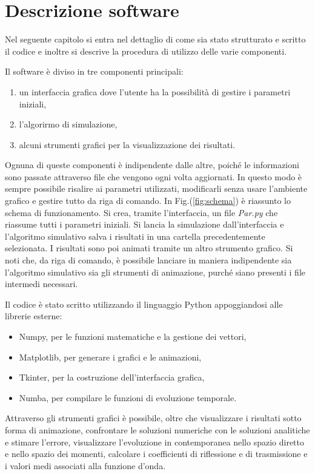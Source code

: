 \documentclass[12pt]{report}
\begin{document}
\chapter{Descrizione software}
\label{ch:interface}

Nel seguente capitolo si entra nel dettaglio di come sia stato strutturato e scritto il codice e inoltre si descrive la procedura di utilizzo delle varie componenti. 

Il software è diviso in tre componenti principali:
\begin{enumerate} [nolistsep]
    \item un interfaccia grafica dove l'utente ha la possibilità di gestire i parametri iniziali,
    \item l'algorirmo di simulazione,
    \item alcuni strumenti grafici per la visualizzazione dei risultati.
\end{enumerate}
Ognuna di queste componenti è indipendente dalle altre, poiché le informazioni sono passate attraverso file che vengono ogni volta aggiornati. In questo modo è sempre possibile risalire ai parametri utilizzati, modificarli senza usare l'ambiente grafico e gestire tutto da riga di comando.
In Fig.(\ref{fig:schema}) è riassunto lo schema di funzionamento. Si crea, tramite l'interfaccia, un file \textsl{Par.py} che riassume tutti i parametri iniziali. Si lancia la simulazione dall'interfaccia e l'algoritmo simulativo salva i risultati in una cartella precedentemente selezionata. I risultati sono poi animati tramite un altro strumento grafico. Si noti che, da riga di comando, è possibile lanciare in maniera indipendente sia l'algoritmo simulativo sia gli strumenti di animazione, purché siano presenti i file intermedi necessari.

Il codice è stato scritto utilizzando il linguaggio Python appoggiandosi alle librerie esterne:
\begin{itemize}[nolistsep]
    \item Numpy, per le funzioni matematiche e la gestione dei vettori,
    \item Matplotlib, per generare i grafici e le animazioni,
    \item Tkinter, per la costruzione dell'interfaccia grafica,
    \item Numba, per compilare le funzioni di evoluzione temporale.
\end{itemize}
Attraverso gli strumenti grafici è possibile, oltre che visualizzare i risultati sotto forma di animazione, confrontare le soluzioni numeriche con le soluzioni analitiche e stimare l'errore, visualizzare l'evoluzione in contemporanea nello spazio diretto e nello spazio dei momenti, calcolare i coefficienti di riflessione e di trasmissione e i valori medi associati alla funzione d'onda.
\end{document}
